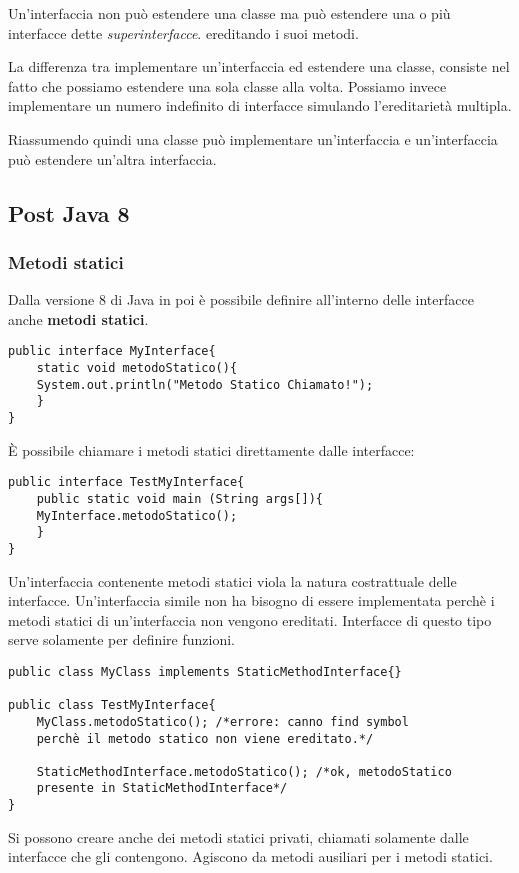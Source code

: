 Un'interfaccia non può estendere una classe ma può estendere una o più interfacce dette \textit{superinterfacce}. ereditando i suoi metodi.

La differenza tra implementare un'interfaccia ed estendere una classe, consiste nel fatto che possiamo estendere una sola classe alla volta. Possiamo invece implementare un numero indefinito di interfacce simulando l'ereditarietà multipla.

Riassumendo quindi una classe può implementare un'interfaccia e un'interfaccia può estendere un'altra interfaccia.

\subsection{Post Java 8}
\subsubsection{Metodi statici}
Dalla versione 8 di Java in poi è possibile definire all'interno delle interfacce anche \textbf{metodi statici}.
\begin{lstlisting}
public interface MyInterface{
	static void metodoStatico(){
	System.out.println("Metodo Statico Chiamato!");
	}
}
\end{lstlisting}
È possibile chiamare i metodi statici direttamente dalle interfacce:
\begin{lstlisting}
public interface TestMyInterface{
	public static void main (String args[]){
	MyInterface.metodoStatico();
	}
}
\end{lstlisting}
Un'interfaccia contenente metodi statici viola la natura costrattuale delle interfacce. Un'interfaccia simile non ha bisogno di essere implementata perchè i metodi statici di un'interfaccia non vengono ereditati. Interfacce di questo tipo serve solamente per definire funzioni.

\begin{lstlisting}
public class MyClass implements StaticMethodInterface{}

public class TestMyInterface{
	MyClass.metodoStatico(); /*errore: canno find symbol
	perchè il metodo statico non viene ereditato.*/

	StaticMethodInterface.metodoStatico(); /*ok, metodoStatico
	presente in StaticMethodInterface*/
}
\end{lstlisting}
Si possono creare anche dei metodi statici privati, chiamati solamente dalle interfacce che gli contengono. Agiscono da metodi ausiliari per i metodi statici.

